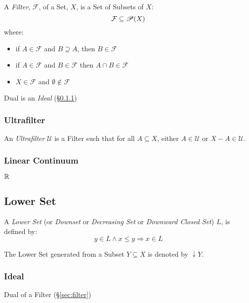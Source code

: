 A \emph{Filter}, $\mathcal{F}$, of a Set, $X$, is a Set of Subsets of
$X$:
\[
  \mathcal{F} \subseteq \mathscr{P}(X)
\]
where:
\begin{itemize}
\item if $A \in \mathcal{F}$ and $B \supseteq A$, then $B \in
  \mathcal{F}$
\item if $A \in \mathcal{F}$ and $B \in \mathcal{F}$ then $A \cap B
  \in \mathcal{F}$
\item $X \in \mathcal{F}$ and $\emptyset \notin \mathcal{F}$
\end{itemize}

Dual is an \emph{Ideal} (\S\ref{sec:order_ideal})



\subsubsection{Ultrafilter}\label{sec:ultrafilter}

An \emph{Ultrafilter} $\mathcal{U}$ is a Filter such that for all $A
\subseteq X$, either $A \in \mathcal{U}$ or $X - A \in \mathcal{U}$.



\subsubsection{Linear Continuum}\label{sec:linear_continuum}

$\mathbb{R}$



\subsection{Lower Set}\label{sec:lower_set}

A \emph{Lower Set} (or \emph{Downset} or \emph{Decreasing Set} or
\emph{Downward Closed Set}) $L$, is defined by:
\[
  y \in L \wedge x \leq y \Rightarrow x \in L
\]

The Lower Set generated from a Subset $Y \subseteq X$ is denoted by
$\downarrow Y$.



\subsubsection{Ideal}\label{sec:order_ideal}

Dual of a Filter (\S\ref{sec:filter})



